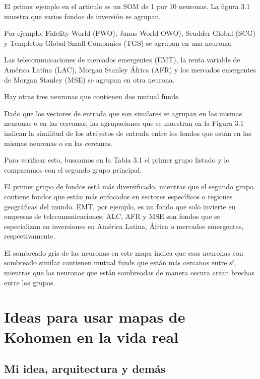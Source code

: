 \documentclass[fleqn, journal, onecolumn]{IEEEtran}             %
\theoremstyle{break}                                            %
\begin{document}
        El primer ejemplo en el articulo es un SOM de 1 por 10 neuronas. 
        La figura 3.1 muestra que varios fondos de inversión se agrupan. 
        
        Por ejemplo, Fidelity World (FWO), Janus World OWO), Scudder Global (SCG) y Templeton 
        Global Small Companies (TGS) se agrupan en una neurona; 
        
        Las telecomunicaciones de mercados emergentes (EMT), la renta variable de América Latina (LAC), 
        Morgan Stanley África (AFR) y los mercados emergentes de Morgan Stanley (MSE) se 
        agrupan en otra neurona. 
        
        Hay otras tres neuronas que contienen dos mutual funds. 
        
        Dado que los vectores de entrada que son similares se agrupan en las mismas neuronas o 
        en las cercanas, las agrupaciones que se muestran en la Figura 3.1 indican la similitud 
        de los atributos de entrada entre los fondos que están en las mismas neuronas o en las cercanas.
        
        Para verificar esto, buscamos en la Tabla 3.1 el primer grupo listado y lo
        comparamos con el segundo grupo principal. 
        
        El primer grupo de fondos está más diversificado, mientras que el segundo grupo contiene
        fondos que están más enfocados en sectores específicos o regiones geográficas del mundo.
        EMT, por ejemplo, es un fondo que solo invierte en empresas de telecomunicaciones; ALC, AFR
        y MSE son fondos que se especializan en inversiones en América Latina, África 
        o mercados emergentes, respectivamente. 
        
        El sombreado gris de las neuronas en este mapa indica que esas neuronas con sombreado
        similar contienen mutual funds que están más cercanos entre sí, mientras que las 
        neuronas que están sombreadas de manera oscura crean brechas entre los grupos.


    \section{Ideas para usar mapas de Kohomen en la vida real}

        

      \subsection{Mi idea, arquitectura y demás}
\end{document}
